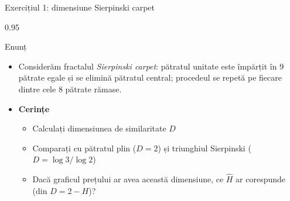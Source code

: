 \documentclass[9pt, aspectratio=169, t]{beamer}
\begin{document}
\begin{frame}[shrink=15]{Exercițiul 1: dimensiune Sierpinski carpet}
\begin{cminipage}{0.95\textwidth}
\begin{block}{Enunț}
\begin{itemize}\setlength{\itemsep}{0pt}
    \item Considerăm fractalul \textit{Sierpinski carpet}: pătratul unitate este împărțit în 9 pătrate egale și se elimină pătratul central; procedeul se repetă pe fiecare dintre cele 8 pătrate rămase.
\end{itemize}
\end{block}
\begin{itemize}\setlength{\itemsep}{0pt}
    \item \textbf{Cerințe}
    \begin{itemize}\setlength{\itemsep}{0pt}
        \item Calculați dimensiunea de similaritate $D$
        \item Comparați cu pătratul plin ($D=2$) și triunghiul Sierpinski ($D=\log 3/\log 2$)
        \item Dacă graficul prețului ar avea această dimensiune, ce $\hat H$ ar corespunde (din $D=2-H$)?
    \end{itemize}
\end{itemize}
\end{cminipage}
\end{frame}
\end{document}
